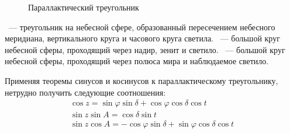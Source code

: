 \begin{wrapfigure}[14]{r}{0.5\tw}

    \caption{Параллактический треугольник}
    \label{pic:paralactic-triangle}    
\end{wrapfigure}

~--- треугольник на небесной сфере, образованный пересечением небесного меридиана, вертикального круга и часового круга светила. ~--- большой круг небесной сферы, проходящий через надир, зенит и светило. ~--- большой круг небесной сферы, проходящий через полюса мира и наблюдаемое светило.

Применяя теоремы синусов и косинусов к параллактическому треугольнику, нетрудно получить следующие соотношения:
\begin{gather}
    \cos z=\sin\varphi\sin\delta+\cos\varphi\cos\delta\cos t\\
    \sin z\sin A=\cos\delta\sin t\\
    \sin z\cos A=-\cos\varphi\sin\delta+\sin\varphi\cos\delta\cos t
\end{gather}

